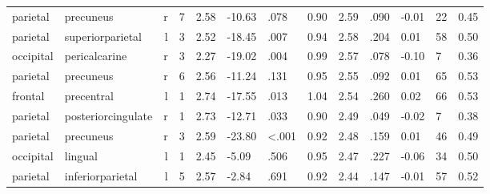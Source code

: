 \documentclass{article}
\begin{document}
\begin{longtable}{llrR{1.3cm}R{1cm}R{1.3cm}R{1cm}R{1cm}R{1.3cm}R{1cm}R{1.8cm}R{1.3cm}R{1.8cm}}
  parietal &                 precuneus &    r &         7 &                  2.58 &           -10.63 &               .078 &                               0.90 &                          2.59 &                            .090 &  -0.01 &     22 &      0.45 \\
  parietal &          superiorparietal &    l &         3 &                  2.52 &           -18.45 &               .007 &                               0.94 &                          2.58 &                            .204 &   0.01 &     58 &      0.50 \\
 occipital &             pericalcarine &    r &         3 &                  2.27 &           -19.02 &               .004 &                               0.99 &                          2.57 &                            .078 &  -0.10 &      7 &      0.36 \\
  parietal &                 precuneus &    r &         6 &                  2.56 &           -11.24 &               .131 &                               0.95 &                          2.55 &                            .092 &   0.01 &     65 &      0.53 \\
   frontal &                precentral &    l &         1 &                  2.74 &           -17.55 &               .013 &                               1.04 &                          2.54 &                            .260 &   0.02 &     66 &      0.53 \\
  parietal &        posteriorcingulate &    r &         1 &                  2.73 &           -12.71 &               .033 &                               0.90 &                          2.49 &                            .049 &  -0.02 &      7 &      0.38 \\
  parietal &                 precuneus &    r &         3 &                  2.59 &           -23.80 &      \textless.001 &                               0.92 &                          2.48 &                            .159 &   0.01 &     46 &      0.49 \\
 occipital &                   lingual &    l &         1 &                  2.45 &            -5.09 &               .506 &                               0.95 &                          2.47 &                            .227 &  -0.06 &     34 &      0.50 \\
  parietal &          inferiorparietal &    l &         5 &                  2.57 &            -2.84 &               .691 &                               0.92 &                          2.44 &                            .147 &  -0.01 &     57 &      0.52 \\

\end{longtable}
\end{document}
